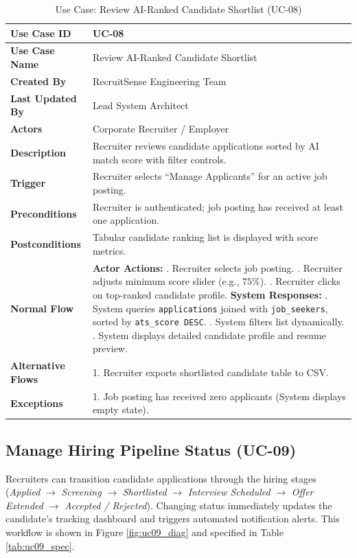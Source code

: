 \begin{table}[h!]
\centering
\small
\caption{Use Case: Review AI-Ranked Candidate Shortlist (UC-08)}
\label{tab:uc08_spec}
\begin{tabular}{|p{3.5cm}|p{11.5cm}|}
\hline
\textbf{Use Case ID} & UC-08 \\ \hline
\textbf{Use Case Name} & Review AI-Ranked Candidate Shortlist \\ \hline
\textbf{Created By} & RecruitSense Engineering Team \\ \hline
\textbf{Last Updated By} & Lead System Architect \\ \hline
\textbf{Actors} & Corporate Recruiter / Employer \\ \hline
\textbf{Description} & Recruiter reviews candidate applications sorted by AI match score with filter controls. \\ \hline
\textbf{Trigger} & Recruiter selects ``Manage Applicants'' for an active job posting. \\ \hline
\textbf{Preconditions} & Recruiter is authenticated; job posting has received at least one application. \\ \hline
\textbf{Postconditions} & Tabular candidate ranking list is displayed with score metrics. \\ \hline
\textbf{Normal Flow} & 
\textbf{Actor Actions:} \newline
1. Recruiter selects job posting. \newline
3. Recruiter adjusts minimum score slider (e.g., $75\%$). \newline
5. Recruiter clicks on top-ranked candidate profile. \newline
\textbf{System Responses:} \newline
2. System queries \texttt{applications} joined with \texttt{job\_seekers}, sorted by \texttt{ats\_score DESC}. \newline
4. System filters list dynamically. \newline
6. System displays detailed candidate profile and resume preview. \\ \hline
\textbf{Alternative Flows} & 1. Recruiter exports shortlisted candidate table to CSV. \\ \hline
\textbf{Exceptions} & 1. Job posting has received zero applicants (System displays empty state). \\ \hline
\end{tabular}
\end{table}

\subsection{Manage Hiring Pipeline Status (UC-09)}
Recruiters can transition candidate applications through the hiring stages (\textit{Applied} $\rightarrow$ \textit{Screening} $\rightarrow$ \textit{Shortlisted} $\rightarrow$ \textit{Interview Scheduled} $\rightarrow$ \textit{Offer Extended} $\rightarrow$ \textit{Accepted / Rejected}). Changing status immediately updates the candidate's tracking dashboard and triggers automated notification alerts. This workflow is shown in Figure \ref{fig:uc09_diag} and specified in Table \ref{tab:uc09_spec}.

